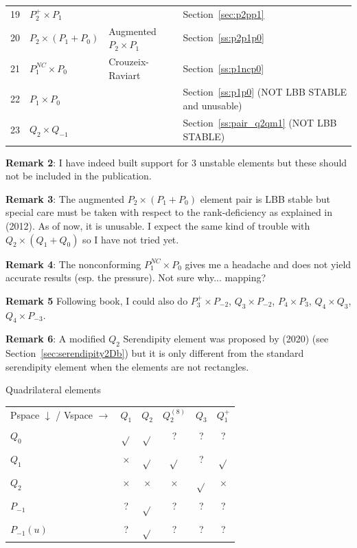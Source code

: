 \begin{center}
\begin{tabular}{p{1cm}p{2cm}p{4cm}p{8cm}}
19&$P_2^+\times P_{1}$   &                  & Section~\ref{sec:p2pp1}\\
20&$P_2\times (P_1+P_0)$ & Augmented $P_2\times P_1$ & Section~\ref{ss:p2p1p0}\\
21&$P_1^{NC}\times P_0$  & Crouzeix-Raviart & Section~\ref{ss:p1ncp0}\\
22&$P_1\times P_0$       &                  & Section~\ref{ss:p1p0}  (NOT LBB STABLE and unusable)\\
23&$Q_2\times Q_{-1}$    &                  & Section~\ref{ss:pair_q2qm1} (NOT LBB STABLE)\\
\hline
\end{tabular}
\end{center}


{\bf Remark 2}: I have indeed built support for 3 unstable elements but 
these should not be included in the publication. 

{\bf Remark 3}: The augmented $P_2\times (P_1+P_0)$ element pair is LBB stable 
but special care must be taken with respect to the rank-deficiency 
as explained in \textcite{bocg12} (2012). As of now, it is unusable.
I expect the same kind of trouble with $Q_2\times (Q_1+Q_0)$ so I have not tried yet.

{\bf Remark 4}: The nonconforming $P_1^{NC}\times P_0$ gives me a headache and does not 
yield accurate results (esp. the pressure). Not sure why... mapping?

{\bf Remark 5} Following \textcite{john16} book, I could also do 
$P_3^+\times P_{-2}$, $Q_3\times P_{-2}$, $P_4\times P_3$, $Q_4\times Q_3$, $Q_4 \times P_{-3}$.

{\bf Remark 6}: A modified $Q_2$ Serendipity element was proposed by \textcite{zhxi20} (2020) 
(see Section~\ref{sec:serendipity2Db}) but it is only different from the standard serendipity 
element when the elements are not rectangles. 


\vspace{1cm}

\begin{center}
Quadrilateral elements\\
\begin{tabular}{lccccc}
\hline
Pspace $\downarrow$ / Vspace $\rightarrow$   
            & $Q_1$     & $Q_2$     & $Q_2^{(8)}$ & $Q_3$  & $Q_1^+$       \\ 
$Q_0$       & $\sqrt{}$ & $\sqrt{}$ & ?           & ?         & ?          \\
$Q_1$       & $\times$  & $\sqrt{}$ & $\sqrt{}$   & ?         & $\sqrt{}$  \\
$Q_2$       & $\times$  & $\times$  & $\times$    & $\sqrt{}$ & $\times$   \\
$P_{-1}$    & ?         & $\sqrt{}$ & ?           & ?         & ?          \\
$P_{-1}(u)$ & ?         & $\sqrt{}$ & ?           & ?         & ?          \\
\hline
\end{tabular}
\end{center}




